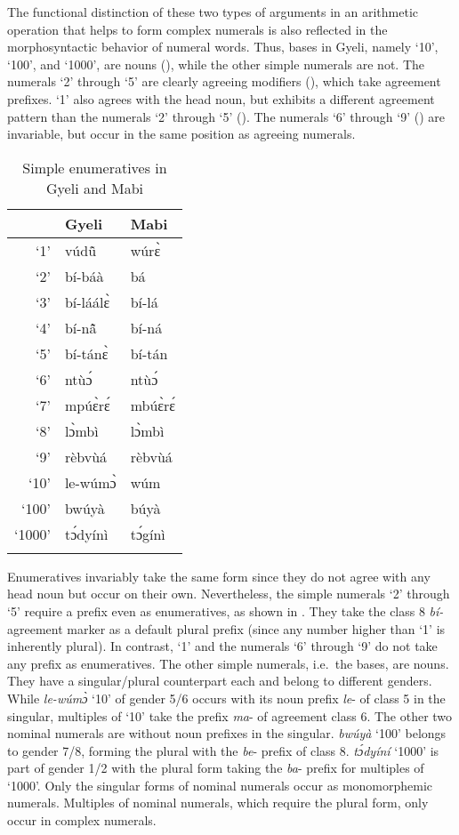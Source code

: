 The functional distinction of these two types of arguments in an arithmetic operation that helps to form complex numerals is also reflected in the morphosyntactic behavior of numeral words. Thus, bases in Gyeli, namely `10', `100', and `1000', are nouns (), while the other simple numerals are not. The numerals  `2' through `5' are clearly agreeing modifiers (), which take agreement prefixes. `1'  also agrees with the head noun, but exhibits a different agreement pattern than the numerals `2' through `5' (). The numerals `6' through `9'  () are  invariable, but occur in the same position as agreeing numerals.


\begin{table}
\begin{tabular}{rll}
 \lsptoprule
 & Gyeli & Mabi \\
  \midrule
 `1' & vúdũ̂ & wúrɛ̀ \\
 `2' & bí-báà & bá \\
 `3' & bí-láálɛ̀ & bí-lá\\
 `4' & bí-nã̂ & bí-ná\\
 `5' & bí-tánɛ̀ & bí-tán \\
 `6' & ntùɔ́ & ntùɔ́  \\
  `7' & mpúɛ̀rɛ́ & mbúɛ̀rɛ́ \\
 `8' & lɔ̀mbì & lɔ̀mbì \\
 `9' & rèbvùá & rèbvùá\\
 `10' & le-wúmɔ̀ & wúm \\
`100' & bwúyà & búyà \\
`1000' & tɔ́dyínì & tɔ́gínì \\
  \lspbottomrule
\end{tabular}
\caption{Simple enumeratives in Gyeli and Mabi}
\label{tab:Enum}
\end{table}

Enumeratives invariably take  the same form since they do not agree with any head noun but occur on their own. Nevertheless, the simple numerals `2' through `5' require a prefix even as enumeratives, as shown in . They take the class 8 {\itshape bí-} agreement marker as a default plural prefix (since any number higher than `1' is inherently plural). In contrast, `1' and the numerals `6' through `9' do not take any prefix as enumeratives. The other simple numerals, i.e.~the bases, are nouns. They have a singular/plural counterpart each and belong to different genders. While {\itshape le-wúmɔ̀} `10' of gender 5/6  occurs with its noun prefix {\itshape le}- of class 5 in the singular, multiples of `10' take the prefix {\itshape ma}- of agreement class 6.  The other two nominal numerals are without noun prefixes in the singular. {\itshape bwúyà} `100' belongs to gender 7/8, forming the plural with the {\itshape be}- prefix of class 8.  {\itshape tɔ́dyíní} `1000' is part of gender 1/2 with the plural form taking the {\itshape ba}- prefix for multiples of `1000'. Only the singular forms of nominal numerals occur as monomorphemic numerals. Multiples of nominal numerals, which require the plural form, only occur in complex numerals.

